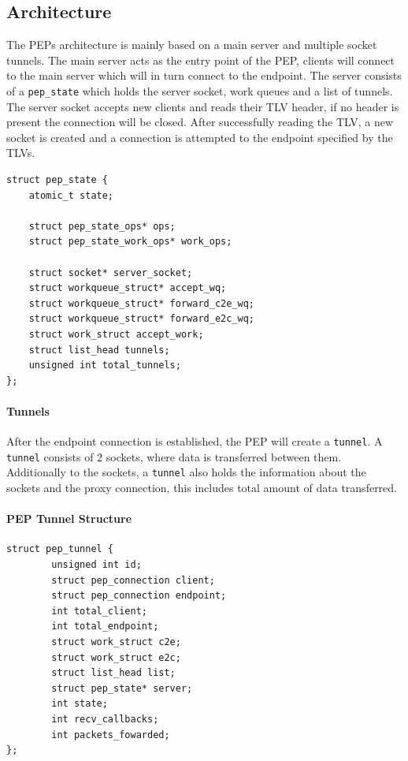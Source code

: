 \documentclass[a4paper,english, 11pt]{report}
\begin{document}
\subsection{Architecture}
The PEPs architecture is mainly based on a main server and multiple socket tunnels. The main server acts as the entry point of the PEP, clients will connect to the main server which will in turn connect to the endpoint. The server consists of a \verb|pep_state| which holds the server socket, work queues and a list of tunnels. The server socket accepts new clients and reads their TLV header, if no header is present the connection will be closed. After successfully reading the TLV, a new socket is created and a connection is attempted to the endpoint specified by the TLVs.\\

\noindent\begin{minipage}{\linewidth}
\begin{verbatim}
struct pep_state {
    atomic_t state;
    
    struct pep_state_ops* ops;
    struct pep_state_work_ops* work_ops;
    
    struct socket* server_socket;
    struct workqueue_struct* accept_wq;
    struct workqueue_struct* forward_c2e_wq;
    struct workqueue_struct* forward_e2c_wq;
    struct work_struct accept_work;
    struct list_head tunnels;
    unsigned int total_tunnels;
};
\end{verbatim}
\label{fig:pep_state_structure}
\end{minipage}

\paragraph{Tunnels}
After the endpoint connection is established, the PEP will create a \verb|tunnel|. A \verb|tunnel| consists of 2 sockets, where data is transferred between them. Additionally to the sockets, a \verb|tunnel| also holds the information about the sockets and the proxy connection, this includes total amount of data transferred.\\

\noindent\begin{minipage}{\linewidth}
\paragraph{PEP Tunnel Structure}
\begin{verbatim}
struct pep_tunnel {
        unsigned int id;
        struct pep_connection client;
        struct pep_connection endpoint;
        int total_client;
        int total_endpoint;
        struct work_struct c2e;
        struct work_struct e2c;
        struct list_head list;
        struct pep_state* server;
        int state;
        int recv_callbacks;
        int packets_fowarded;
};
\end{verbatim}
\end{minipage}
\end{document}
